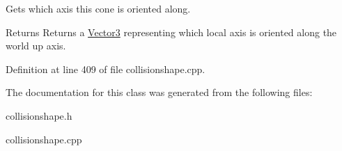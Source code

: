 Gets which axis this cone is oriented along. 

\begin{DoxyReturn}{Returns}
Returns a \hyperlink{classphys_1_1Vector3}{Vector3} representing which local axis is oriented along the world up axis. 
\end{DoxyReturn}


Definition at line 409 of file collisionshape.cpp.



The documentation for this class was generated from the following files:\begin{DoxyCompactItemize}
\item 
collisionshape.h\item 
collisionshape.cpp\end{DoxyCompactItemize}
